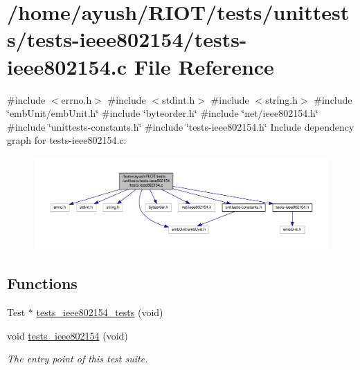 \hypertarget{tests-ieee802154_8c}{}\section{/home/ayush/\+R\+I\+O\+T/tests/unittests/tests-\/ieee802154/tests-\/ieee802154.c File Reference}
\label{tests-ieee802154_8c}
{\ttfamily \#include $<$errno.\+h$>$}\newline
{\ttfamily \#include $<$stdint.\+h$>$}\newline
{\ttfamily \#include $<$string.\+h$>$}\newline
{\ttfamily \#include \char`\"{}emb\+Unit/emb\+Unit.\+h\char`\"{}}\newline
{\ttfamily \#include \char`\"{}byteorder.\+h\char`\"{}}\newline
{\ttfamily \#include \char`\"{}net/ieee802154.\+h\char`\"{}}\newline
{\ttfamily \#include \char`\"{}unittests-\/constants.\+h\char`\"{}}\newline
{\ttfamily \#include \char`\"{}tests-\/ieee802154.\+h\char`\"{}}\newline
Include dependency graph for tests-\/ieee802154.c\+:
\nopagebreak
\begin{figure}[H]
\begin{center}
\leavevmode
\includegraphics[width=350pt]{tests-ieee802154_8c__incl}
\end{center}
\end{figure}
\subsection*{Functions}
\textbf{ }\par
\begin{DoxyCompactItemize}
\item 
Test $\ast$ \hyperlink{tests-ieee802154_8c_a13102a54316da9c2a4e04e50aee78196}{tests\+\_\+ieee802154\+\_\+tests} (void)
\item 
void \hyperlink{group__unittests_ga610840bb2928eb0ca34a53f887a7e884}{tests\+\_\+ieee802154} (void)
\begin{DoxyCompactList}\small\item\em The entry point of this test suite. \end{DoxyCompactList}\end{DoxyCompactItemize}



